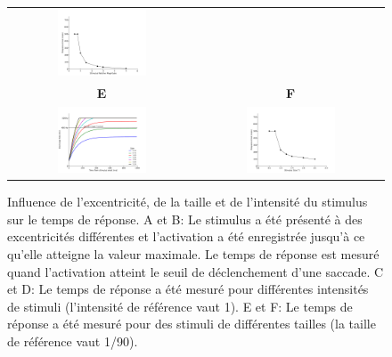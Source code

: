 \begin{figure}
\begin{center}
\begin{tabular}[t]{cc}
      \includegraphics[width=0.5\textwidth]{figures/ch3_7_RT-size-B} \\
      {\textsf {\textbf E}} &
      {\textsf {\textbf F}} \\     
      \includegraphics[width=0.5\textwidth]{figures/ch3_7_RT-magnitude-A} &
      \includegraphics[width=0.5\textwidth]{figures/ch3_7_RT-magnitude-B} \\
    \end{tabular}

  \end{center}

  \caption{Influence de l'excentricité, de la taille et de l'intensité du stimulus sur le temps de réponse. A et B: Le stimulus a été présenté à des excentricités différentes et l'activation a été enregistrée jusqu'à ce qu'elle atteigne la valeur maximale. Le temps de réponse est mesuré quand l'activation atteint le seuil de déclenchement d'une saccade. C et D: Le temps de réponse a été mesuré pour différentes intensités de stimuli (l'intensité de référence vaut 1). E et F: Le temps de réponse a été mesuré pour des stimuli de différentes tailles (la taille de référence vaut 1/90).
  }
  \label{fig: time}
\end{figure}


